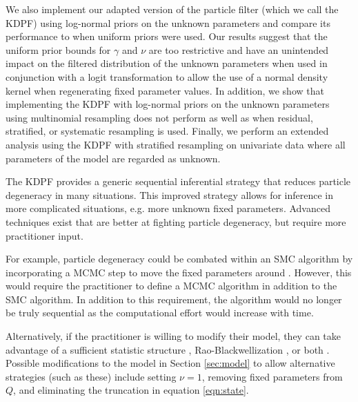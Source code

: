We also implement our adapted version of the \citet{Liu:West:comb:2001} particle filter (which we call the KDPF) using log-normal priors on the unknown parameters and compare its performance to when uniform priors were used. Our results suggest that the uniform prior bounds for $\gamma$ and $\nu$ are too restrictive and have an unintended impact on the filtered distribution of the unknown parameters when used in conjunction with a logit transformation to allow the use of a normal density kernel when regenerating fixed parameter values. In addition, we show that implementing the KDPF with log-normal priors on the unknown parameters using multinomial resampling does not perform as well as when residual, stratified, or systematic resampling is used. Finally, we perform an extended analysis using the KDPF with stratified resampling on univariate data where all parameters of the model are regarded as unknown.

The KDPF provides a generic sequential inferential strategy that reduces particle degeneracy in many situations. This improved strategy allows for inference in more complicated situations, e.g. more unknown fixed parameters. Advanced techniques exist that are better at fighting particle degeneracy, but require more practitioner input.

For example, particle degeneracy could be combated within an SMC algorithm by incorporating a MCMC step to move the fixed parameters around \citep{Gilk:Berz:foll:2001,Stor:part:2002}. However, this would require the practitioner to define a MCMC algorithm in addition to the SMC algorithm. In addition to this requirement, the algorithm would no longer be truly sequential as the computational effort would increase with time.

Alternatively, if the practitioner is willing to modify their model, they can take advantage of a sufficient statistic structure \citep{Fear:mark:2002}, Rao-Blackwellization \citep{Douc:Gods:Andr:on:2000}, or both \citep{carvalho2010particle}. Possible modifications to the model in Section \ref{sec:model} to allow alternative strategies (such as these) include setting $\nu=1$, removing fixed parameters from $Q$, and eliminating the truncation in equation \eqref{eqn:state}. 